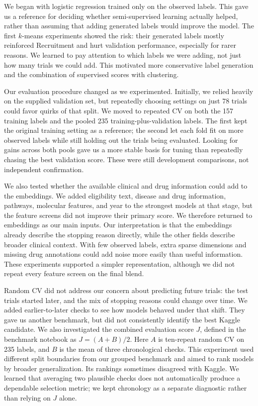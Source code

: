 \documentclass[10pt,twocolumn,letterpaper]{article}
\begin{document}
We began with logistic regression trained only on the observed labels. This
gave us a reference for deciding whether semi-supervised learning actually
helped, rather than assuming that adding generated labels would improve the
model. The first $k$-means experiments showed the risk: their generated labels
mostly reinforced Recruitment and hurt validation performance, especially for
rarer reasons. We learned to pay attention to which labels we were adding,
not just how many trials we could add. This motivated more conservative label
generation and the combination of supervised scores with clustering.

Our evaluation procedure changed as we experimented. Initially, we relied
heavily on the supplied validation set, but repeatedly choosing settings on
just 78 trials could favor quirks of that split. We moved to repeated CV on
both the 157 training labels and the pooled 235 training-plus-validation
labels. The first kept the original training setting as a reference; the
second let each fold fit on more observed labels while still holding out the
trials being evaluated. Looking for gains across both pools gave us a more
stable basis for tuning than repeatedly chasing the best validation score.
These were still development comparisons, not independent confirmation.

We also tested whether the available clinical and drug information could add
to the embeddings. We added eligibility text, disease and drug information,
pathways, molecular features, and year to the strongest models at that stage,
but the feature screens did not improve their primary score. We therefore
returned to embeddings as our main inputs. Our interpretation is that the
embeddings already describe the stopping reason directly, while the other
fields describe broader clinical context. With few observed labels, extra
sparse dimensions and missing drug annotations could add noise more easily
than useful information. These experiments supported a simpler representation,
although we did not repeat every feature screen on the final blend.

Random CV did not address our concern about predicting future trials: the test
trials started later, and the mix of stopping reasons could change over time.
We added earlier-to-later checks to see how models behaved under that shift.
They gave us another benchmark, but did not consistently identify the best
Kaggle candidate. We also investigated the combined evaluation score $J$,
defined in the benchmark notebook as $J=(A+B)/2$. Here $A$ is ten-repeat random
CV on 235 labels, and $B$ is the mean of three chronological checks. This
experiment used different split boundaries from our grouped benchmark and aimed
to rank models by broader generalization. Its rankings sometimes disagreed
with Kaggle. We learned that averaging two
plausible checks does not automatically produce a dependable selection metric;
we kept chronology as a separate diagnostic rather than relying on $J$ alone.
\end{document}
